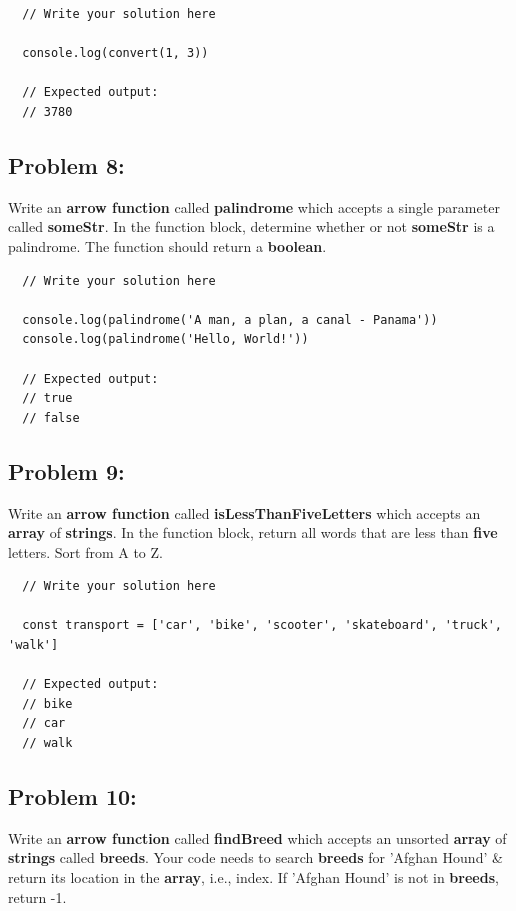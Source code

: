 \documentclass{article}
\begin{document}
\begin{verbatim}
  // Write your solution here

  console.log(convert(1, 3))

  // Expected output:
  // 3780
\end{verbatim}

\subsection*{Problem 8:}
Write an \textbf{arrow function} called \textbf{palindrome} which accepts a single parameter called \textbf{someStr}. In the function block, determine whether or not \textbf{someStr} is a palindrome. The function should return a \textbf{boolean}.

\begin{verbatim}
  // Write your solution here

  console.log(palindrome('A man, a plan, a canal - Panama'))
  console.log(palindrome('Hello, World!'))

  // Expected output:
  // true
  // false
\end{verbatim}
 
\subsection*{Problem 9:}
Write an \textbf{arrow function} called \textbf{isLessThanFiveLetters} which accepts an \textbf{array} of \textbf{strings}. In the function block, return all words that are less than \textbf{five} letters. Sort from A to Z.

\begin{verbatim} 
  // Write your solution here

  const transport = ['car', 'bike', 'scooter', 'skateboard', 'truck', 'walk']

  // Expected output:
  // bike
  // car
  // walk
\end{verbatim}

\subsection*{Problem 10:} 
Write an \textbf{arrow function} called \textbf{findBreed} which accepts an unsorted \textbf{array} of \textbf{strings} called \textbf{breeds}. Your code needs to search \textbf{breeds} for 'Afghan Hound' \& return its location in the \textbf{array}, i.e., index. If 'Afghan Hound' is not in \textbf{breeds}, return -1.
\end{document}
